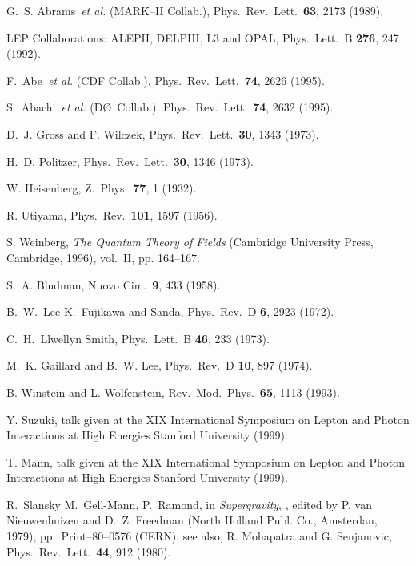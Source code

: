 \documentclass[12pt]{report}
\begin{document}
\begin{thebibliography}{100}
G.~S. Abrams~{{\it et al.}} {(MARK--II Collab.)}, Phys.\ Rev.\ Lett.\ {\bf 63},
   2173  (1989).

{LEP Collaborations: ALEPH, DELPHI, L3 and OPAL}, Phys.\ Lett.\ B {\bf 276},
  247  (1992).

F.~Abe~{{\it et al.}} {(CDF Collab.)}, Phys.\ Rev.\ Lett.\ {\bf 74},  2626
  (1995).

S.~Abachi~{{\it et al.}} {(D\O\ Collab.)}, Phys.\ Rev.\ Lett.\ {\bf 74},  2632
  (1995).

D.~J. Gross and F. Wilczek, Phys.\ Rev.\ Lett.\ {\bf 30},  1343  (1973).

H.~D. Politzer, Phys.\ Rev.\ Lett.\ {\bf 30},  1346  (1973).

W. Heisenberg, Z.\ Phys.\ {\bf 77},  1  (1932).

R. Utiyama, Phys.\ Rev.\ {\bf 101},  1597  (1956).

S. Weinberg, {\em The Quantum Theory of Fields} (Cambridge University Press,
  Cambridge, 1996), vol.\ II, pp. 164--167.

S.~A. Bludman, Nuovo Cim.\ {\bf 9},  433  (1958).

B.~W.~Lee K.~Fujikawa and Sanda, Phys.\ Rev.\ D {\bf 6},  2923  (1972).

C.~H.~Llwellyn Smith, Phys.\ Lett.\ B {\bf 46},  233  (1973).

M.~K. Gaillard and B.~W. Lee, Phys.\ Rev.\ D {\bf 10},  897  (1974).

B. Winstein and L. Wolfenstein, Rev.\ Mod.\ Phys.\ {\bf 65},  1113  (1993).

Y. Suzuki, talk given at the XIX International Symposium on Lepton and Photon
  Interactions at High Energies  Stanford University  (1999).

T. Mann, talk given at the XIX International Symposium on Lepton and Photon
  Interactions at High Energies  Stanford University  (1999).

R.~Slansky M.~Gell-Mann, P.~Ramond,  in {\em Supergravity}, {}, edited by P.
  van Nieuwenhuizen and D.~Z. Freedman (North Holland Publ. Co., Amsterdan,
  1979), pp.\ Print--80--0576 (CERN); see also, R. Mohapatra and G. Senjanovic,
  Phys.\ Rev.\ Lett.\ {\bf 44}, 912 (1980).


\end{thebibliography}
\end{document}
